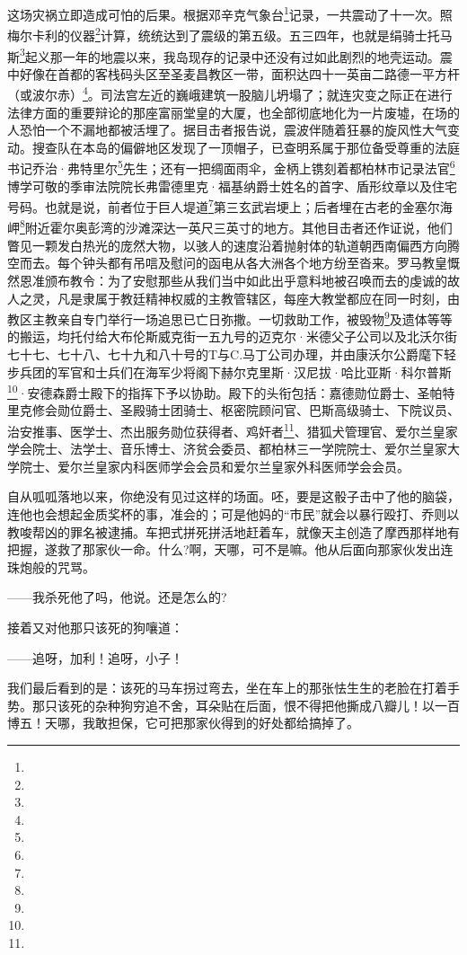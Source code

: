 \par 这场灾祸立即造成可怕的后果。根据邓辛克气象台\footnote{}记录，一共震动了十一次。照梅尔卡利的仪器\footnote{}计算，统统达到了震级的第五级。五三四年，也就是绢骑士托马斯\footnote{}起义那一年的地震以来，我岛现存的记录中还没有过如此剧烈的地壳运动。震中好像在首都的客栈码头区至圣麦昌教区一带，面积达四十一英亩二路德一平方杆（或波尔赤）\footnote{}。司法宫左近的巍峨建筑一股脑儿坍塌了；就连灾变之际正在进行法律方面的重要辩论的那座富丽堂皇的大厦，也全部彻底地化为一片废墟，在场的人恐怕一个不漏地都被活埋了。据目击者报告说，震波伴随着狂暴的旋风性大气变动。搜查队在本岛的偏僻地区发现了一顶帽子，已查明系属于那位备受尊重的法庭书记乔治·弗特里尔\footnote{}先生；还有一把绸面雨伞，金柄上镌刻着都柏林市记录法官\footnote{}博学可敬的季审法院院长弗雷德里克·福基纳爵士姓名的首字、盾形纹章以及住宅号码。也就是说，前者位于巨人堤道\footnote{}第三玄武岩埂上；后者埋在古老的金塞尔海岬\footnote{}附近霍尔奥彭湾的沙滩深达一英尺三英寸的地方。其他目击者还作证说，他们瞥见一颗发白热光的庞然大物，以骇人的速度沿着抛射体的轨道朝西南偏西方向腾空而去。每个钟头都有吊唁及慰问的函电从各大洲各个地方纷至沓来。罗马教皇慨然恩准颁布教令：为了安慰那些从我们当中如此出乎意料地被召唤而去的虔诚的故人之灵，凡是隶属于教廷精神权威的主教管辖区，每座大教堂都应在同一时刻，由教区主教亲自专门举行一场追思已亡日弥撒。一切救助工作，被毁物\footnote{}及遗体等等的搬运，均托付给大布伦斯威克街一五九号的迈克尔·米德父子公司以及北沃尔街七十七、七十八、七十九和八十号的T与C.马丁公司办理，并由康沃尔公爵麾下轻步兵团的军官和士兵们在海军少将阁下赫尔克里斯·汉尼拔·哈比亚斯·科尔普斯\footnote{}·安德森爵士殿下的指挥下予以协助。殿下的头衔包括：嘉德勋位爵士、圣帕特里克修会勋位爵士、圣殿骑士团骑士、枢密院顾问官、巴斯高级骑士、下院议员、治安推事、医学士、杰出服务勋位获得者、鸡奸者\footnote{}、猎狐犬管理官、爱尔兰皇家学会院士、法学士、音乐博士、济贫会委员、都柏林三一学院院士、爱尔兰皇家大学院士、爱尔兰皇家内科医师学会会员和爱尔兰皇家外科医师学会会员。
\par 自从呱呱落地以来，你绝没有见过这样的场面。呸，要是这骰子击中了他的脑袋，连他也会想起金质奖杯的事，准会的；可是他妈的“市民”就会以暴行殴打、乔则以教唆帮凶的罪名被逮捕。车把式拼死拼活地赶着车，就像天主创造了摩西那样地有把握，遂救了那家伙一命。什么?啊，天哪，可不是嘛。他从后面向那家伙发出连珠炮般的咒骂。
\par ——我杀死他了吗，他说。还是怎么的?
\par 接着又对他那只该死的狗嚷道：
\par ——追呀，加利！追呀，小子！
\par 我们最后看到的是：该死的马车拐过弯去，坐在车上的那张怯生生的老脸在打着手势。那只该死的杂种狗穷追不舍，耳朵贴在后面，恨不得把他撕成八瓣儿！以一百博五！天哪，我敢担保，它可把那家伙得到的好处都给搞掉了。
